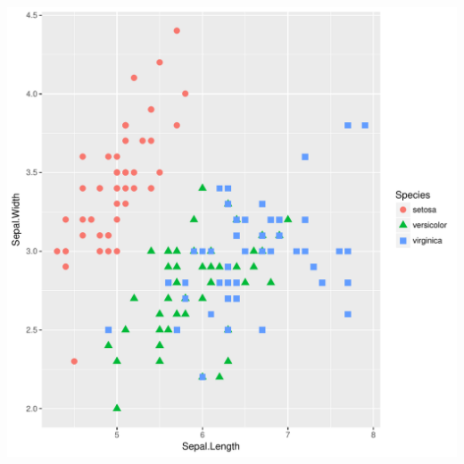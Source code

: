 \documentclass[12pt,oneside]{book}\usepackage[]{graphicx}\usepackage[]{color}
\makeatletter
\def\maxwidth{ %
  \ifdim\Gin@nat@width>\linewidth
    \linewidth
  \else
    \Gin@nat@width
  \fi
}
\newenvironment{kframe}{%
 \def\at@end@of@kframe{}%
 \ifinner\ifhmode%
  \def\at@end@of@kframe{\end{minipage}}%
  \begin{minipage}{\columnwidth}%
 \fi\fi%
 \def\FrameCommand##1{\hskip\@totalleftmargin \hskip-\fboxsep
 \colorbox{shadecolor}{##1}\hskip-\fboxsep
     \hskip-\linewidth \hskip-\@totalleftmargin \hskip\columnwidth}%
 \MakeFramed {\advance\hsize-\width
   \@totalleftmargin\z@ \linewidth\hsize
   \@setminipage}}%
 {\par\unskip\endMakeFramed%
 \at@end@of@kframe}
\newenvironment{knitrout}{}{} %
\makeatother
\begin{document}
\begin{knitrout}
\begin{kframe}
\end{kframe}
\includegraphics[width=\maxwidth]{figure/unnamed-chunk-64-2} 

\end{knitrout}
\end{document}
